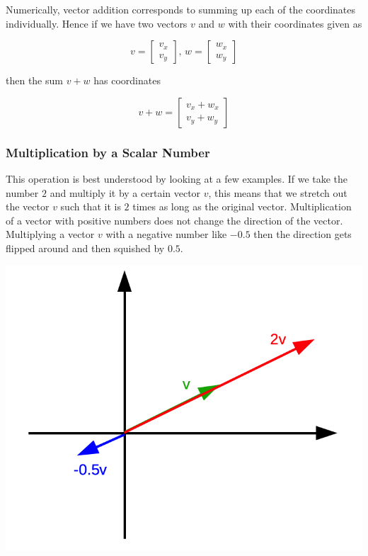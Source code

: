 \documentclass[]{book}
\theoremstyle{definition}
\theoremstyle{definition}
\theoremstyle{definition}
\theoremstyle{remark}
\begin{document}
Numerically, vector addition corresponds to summing up each of the coordinates individually. Hence if we have two vectors \(v\) and \(w\) with their coordinates given as

\[v = \left[\begin{array}{c} v_x \\ v_y \end{array}\right] \text{, } w = \left[\begin{array}{c} w_x \\ w_y \end{array}\right]\]

then the sum \(v+w\) has coordinates

\[v+w =  \left[\begin{array}{c} v_x + w_x \\ v_y+w_y \end{array}\right]\]

\hypertarget{intro-linalg-vector-scalar-multiplication}{%
\subsubsection{Multiplication by a Scalar Number}\label{intro-linalg-vector-scalar-multiplication}}

This operation is best understood by looking at a few examples. If we take the number \(2\) and multiply it by a certain vector \(v\), this means that we stretch out the vector \(v\) such that it is \(2\) times as long as the original vector. Multiplication of a vector with positive numbers does not change the direction of the vector. Multiplying a vector \(v\) with a negative number like \(-0.5\) then the direction gets flipped around and then squished by \(0.5\).

\includegraphics{odg/vector-scalar-multiplication.png}
\end{document}
